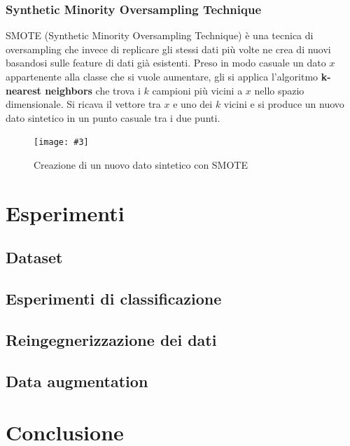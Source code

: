 \documentclass[12pt, twoside, letterpaper]{report}
\newcommand{\img}[4] {
	\begin{figure}
		\centering
		\texttt{[image: \#3]}\\
		\caption{#1}
		\label{#4}
	\end{figure}
}
\begin{document}
			\subsection{Synthetic Minority Oversampling Technique}
				SMOTE (Synthetic Minority Oversampling Technique) è una tecnica di oversampling che invece di replicare gli stessi dati più volte ne crea di nuovi basandosi sulle feature di dati già esistenti. Preso in modo casuale un dato $x$ appartenente alla classe che si vuole aumentare, gli si applica l'algoritmo \textbf{k-nearest neighbors} che trova i $k$ campioni più vicini a $x$ nello spazio dimensionale. Si ricava il vettore tra $x$ e uno dei $k$ vicini e si produce un nuovo dato sintetico in un punto casuale tra i due punti. \cite{smote}
				\img{Creazione di un nuovo dato sintetico con SMOTE}{0.3}{smote.png}{smote}
				
				
	\chapter{Esperimenti} \label{chap:esperimenti}
		\section{Dataset} %
		\section{Esperimenti di classificazione}
		\section{Reingegnerizzazione dei dati}
		\section{Data augmentation}

	\chapter*{Conclusione}	  
	
\end{document}
